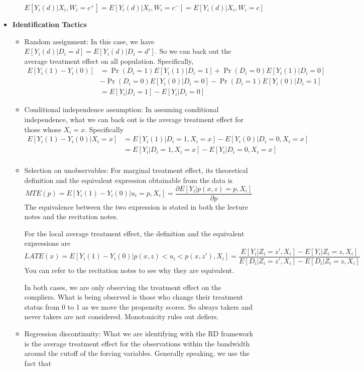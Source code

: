 \documentclass[12pt]{article}
\theoremstyle{definition}
\theoremstyle{property}
\theoremstyle{assumption}
\theoremstyle{example}
\theoremstyle{comment}
\begin{document}
\begin{itemize}
\begin{itemize}
\[
E[Y_i(d)|X_i, W_i=c^+]=E[Y_i(d)|X_i, W_i=c^-]=E[Y_i(d)|X_i, W_i=c]
\]
\end{itemize}
\item \textbf{Identification Tactics}
\begin{itemize}
\item Random assignment: In this case, we have $E[Y_i(d)|D_i=d]=E[Y_i(d)|D_i=d']$. So we can back out the average treatment effect on all population. Specifically, 
\begin{align*}
E[Y_i(1)-Y_i(0)]&=\Pr(D_i=1)E[Y_i(1)|D_i=1]+\Pr(D_i=0)E[Y_i(1)|D_i=0]\\
&-\Pr(D_i=0)E[Y_i(0)|D_i=0]-\Pr(D_i=1)E[Y_i(0)|D_i=1]\\
&=E[Y_i|D_i=1]-E[Y_i|D_i=0]
\end{align*}
\item Conditional independence assumption: In assuming conditional independence, what we can back out is the average treatment effect for those whose $X_i=x$. Specifically
\begin{align*}
E[Y_i(1)-Y_i(0)|X_i=x]&=E[Y_i(1)|D_i=1, X_i=x]-E[Y_i(0)|D_i=0, X_i=x]\\
&=E[Y_i|D_i=1, X_i=x]-E[Y_i|D_i=0, X_i=x]\\
\end{align*}
\item Selection on unobservables: For marginal treatment effect, its theoretical definition and the equivalent expression obtainable from the data is
\[
MTE(p)=E[Y_i(1)-Y_i(0)|u_i=p, X_i]=\frac{\partial E[Y_i|p(x,z)=p, X_i]}{\partial p}
\]
The equivalence between the two expression is stated in both the lecture notes and the recitation notes. \par
For the local average treatment effect, the definition and the equivalent expressions are
\small{\[
LATE(x)=E[Y_i(1)-Y_i(0)|p(x,z)<u_i<p(x,z'),X_i]=\frac{E[Y_i|Z_i=z',X_i]-E[Y_i|Z_i=z,X_i]}{E[D_i|Z_i=z',X_i]-E[D_i|Z_i=z,X_i]}
\]}\normalsize
You can refer to the recitation notes to see why they are equivalent. \par
In both cases, we are only observing the treatment effect on the compliers. What is being observed is those who change their treatment status from 0 to 1 as we move the propensity scores. So always takers and never takers are not considered. Monotonicity rules out defiers. 
\item Regression discontinuity: What we are identifying with the RD framework is the average treatment effect for the observations within the bandwidth around the cutoff of the forcing variables. Generally speaking, we use the fact that

\end{itemize}
\end{itemize}
\end{document}
